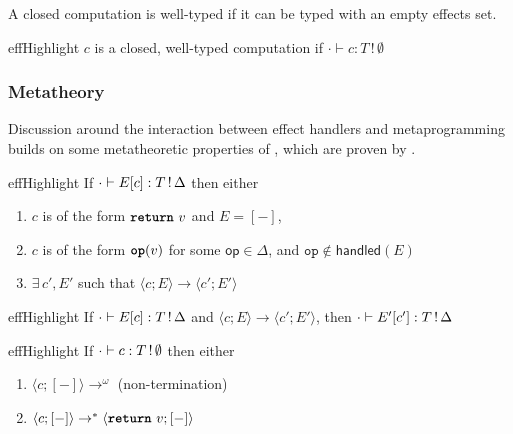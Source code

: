A closed computation is well-typed if it can be typed with an empty effects set.  
\begin{definition}{effHighlight}
  $c$ is a closed, well-typed computation if $\cdot \vdash {c}: {T \, ! \, \emptyset}$
\end{definition}

\subsubsection{Metatheory}
Discussion around the interaction between effect handlers and metaprogramming builds on some metatheoretic properties of \efflang{}, which are proven by \citet{bauer-2014}.

\renewcommand{\effconfiguration}[2]{\langle {#1}; {#2} \rangle}
\renewcommand{\transition}[2]{#1 \rightarrow #2}

\begin{theorem}[Progress]{effHighlight}\label{thm:progress}
If $\cdot \vdash {E[c]}: {\effectType{T}}$ then either 
\begin{enumerate}
\item $c$ is of the form $\return{v}$ and $E = [-]$,
\item $c$ is of the form $\op{v}$ for some $\textsf{op} \in \Delta$, and $\texttt{op} \notin \textsf{handled}({E})$
\item $\exists \, c', E'$ such that $\transition{\effconfiguration{c}{E}}{\effconfiguration{c'}{E'}}$
\end{enumerate}
\end{theorem}
\vspace{-\baselineskip}
\begin{theorem}[Preservation]{effHighlight}\label{thm:preservation}
If $\cdot \vdash {E[c]}: {\effectType{T}}$ and $\transition{\effconfiguration{c}{E}}{\effconfiguration{c'}{E'}}$, then $\cdot \vdash {E'[c']}: {\effectType{T}}$
\end{theorem}
\vspace{-\baselineskip}
\begin{corollary}{effHighlight}\label{thm:type-safety}
  If $\cdot \vdash {c}: {\effectType[\emptyset]{T}}$ then either 
\begin{enumerate}
\item $\langle c; [-] \rangle \to^{\omega}$ (non-termination)
\item $\langle c; [-] \rangle \to^{*} \langle \return{v}; [-] \rangle$
\end{enumerate}
\end{corollary}

